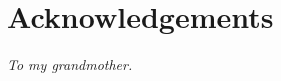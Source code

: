 \pagestyle{plain}

\vspace*{2cm}
\chapter*{Acknowledgements}









\LIMPA

\vfill


\begin{flushright}\textit{To my grandmother.}\end{flushright}

\LIMPA
